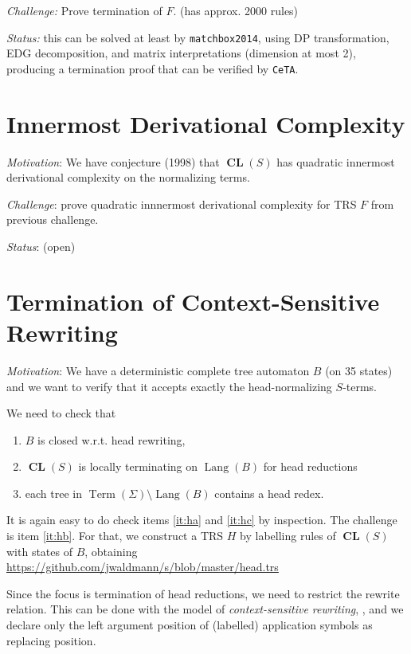 \documentclass[12pt]{article}
\newcommand{\CL}{\operatorname{\textbf{CL}}}
\newcommand{\Term}{\operatorname{Term}}
\newcommand{\Lang}{\operatorname{Lang}}
\begin{document}
\emph{Challenge:} Prove termination of $F$. 
(has approx. 2000 rules)


\emph{Status:} this can be solved at least by 
\texttt{matchbox2014},
using DP transformation, EDG decomposition,
and matrix interpretations (dimension at most 2),
producing a termination proof that can be verified by 
\texttt{CeTA}.

\section{Innermost Derivational Complexity}

\emph{Motivation}: We have conjecture (1998) 
that $\CL(S)$ has quadratic innermost derivational complexity
\cite{DBLP:conf/flops/AvanziniM08}
on the normalizing terms.

\emph{Challenge}: prove quadratic
innnermost derivational complexity for TRS $F$
from previous challenge.

\emph{Status}: (open)

\section{Termination of Context-Sensitive Rewriting}

\emph{Motivation}:
We have a deterministic complete tree automaton $B$
(on 35 states)
and we want to verify that it accepts 
exactly the head-normalizing $S$-terms.

We need to check that 
\begin{enumerate}
\item \label{it:ha} 
  $B$ is closed w.r.t. head rewriting,
\item \label{it:hb} 
  $\CL(S)$ is locally terminating on $\Lang(B)$
  for head reductions
\item \label{it:hc} 
  each tree in $\Term(\Sigma)\setminus\Lang(B)$
  contains a head redex.
\end{enumerate}
It is again easy to do check 
items \ref{it:ha} and \ref{it:hc}
by inspection. The challenge is item \ref{it:hb}.
For that, we construct a TRS $H$ by labelling rules
of $\CL(S)$ with states of $B$, obtaining
\url{https://github.com/jwaldmann/s/blob/master/head.trs}

Since the focus is termination of head reductions,
we need to restrict the rewrite relation.
This can be done with the model of
\emph{context-sensitive rewriting}, 
\cite{DBLP:journals/entcs/AlarconGIL07},
and we declare
only the left argument position of (labelled)
application symbols as replacing position.
\end{document}
